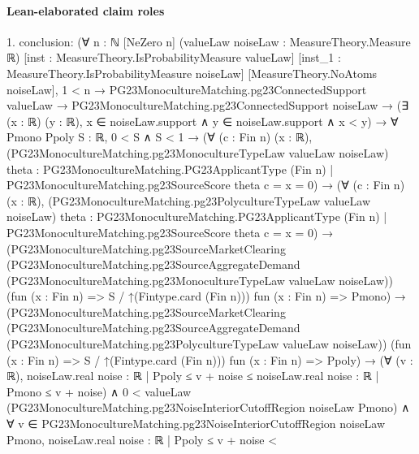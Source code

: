 \documentclass[10pt]{article}
\begin{document}
\paragraph{Lean-elaborated claim roles}\begin{ReviewVerbatim}
1. conclusion: (∀ {n : ℕ} [NeZero n] (valueLaw noiseLaw : MeasureTheory.Measure ℝ) [inst : MeasureTheory.IsProbabilityMeasure valueLaw]
    [inst_1 : MeasureTheory.IsProbabilityMeasure noiseLaw] [MeasureTheory.NoAtoms noiseLaw],
    1 < n →
      PG23MonocultureMatching.pg23ConnectedSupport valueLaw →
        PG23MonocultureMatching.pg23ConnectedSupport noiseLaw →
          (∃ (x : ℝ) (y : ℝ), x ∈ noiseLaw.support ∧ y ∈ noiseLaw.support ∧ x < y) →
            ∀ {Pmono Ppoly S : ℝ},
              0 < S ∧ S < 1 →
                (∀ (c : Fin n) (x : ℝ),
                    (PG23MonocultureMatching.pg23MonocultureTypeLaw valueLaw noiseLaw)
                        {theta : PG23MonocultureMatching.PG23ApplicantType (Fin n) |
                          PG23MonocultureMatching.pg23SourceScore theta c = x} =
                      0) →
                  (∀ (c : Fin n) (x : ℝ),
                      (PG23MonocultureMatching.pg23PolycultureTypeLaw valueLaw noiseLaw)
                          {theta : PG23MonocultureMatching.PG23ApplicantType (Fin n) |
                            PG23MonocultureMatching.pg23SourceScore theta c = x} =
                        0) →
                    (PG23MonocultureMatching.pg23SourceMarketClearing
                        (PG23MonocultureMatching.pg23SourceAggregateDemand
                          (PG23MonocultureMatching.pg23MonocultureTypeLaw valueLaw noiseLaw))
                        (fun (x : Fin n) => S / ↑(Fintype.card (Fin n))) fun (x : Fin n) => Pmono) →
                      (PG23MonocultureMatching.pg23SourceMarketClearing
                          (PG23MonocultureMatching.pg23SourceAggregateDemand
                            (PG23MonocultureMatching.pg23PolycultureTypeLaw valueLaw noiseLaw))
                          (fun (x : Fin n) => S / ↑(Fintype.card (Fin n))) fun (x : Fin n) => Ppoly) →
                        (∀ (v : ℝ),
                            noiseLaw.real {noise : ℝ | Ppoly ≤ v + noise} ≤
                              noiseLaw.real {noise : ℝ | Pmono ≤ v + noise}) ∧
                          0 < valueLaw (PG23MonocultureMatching.pg23NoiseInteriorCutoffRegion noiseLaw Pmono) ∧
                            ∀ v ∈ PG23MonocultureMatching.pg23NoiseInteriorCutoffRegion noiseLaw Pmono,
                              noiseLaw.real {noise : ℝ | Ppoly ≤ v + noise} <

\end{ReviewVerbatim}
\end{document}
